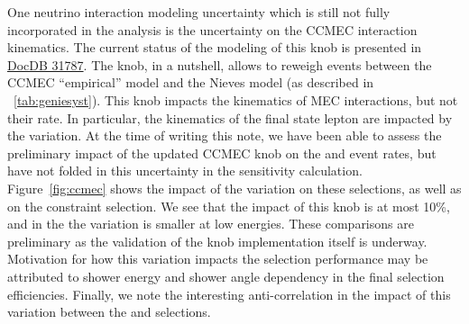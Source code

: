 One neutrino interaction modeling uncertainty which is still not fully incorporated in the analysis is the uncertainty on the CCMEC interaction kinematics. The current status of the modeling of this knob is presented in \href{https://microboone-docdb.fnal.gov/cgi-bin/private/ShowDocument?docid=31787}{DocDB 31787}. The knob, in a nutshell, allows to reweigh events between the CCMEC ``empirical'' model and the Nieves model (as described in ~\cref{tab:geniesyst}). This knob impacts the kinematics of MEC interactions, but not their rate. In particular, the kinematics of the final state lepton are impacted by the variation. At the time of writing this note, we have been able to assess the preliminary impact of the updated CCMEC knob on the \npsel and \zpsel event rates, but have not folded in this uncertainty in the sensitivity calculation. Figure~\ref{fig:ccmec} shows the impact of the variation on these selections, as well as on the constraint \numu selection. We see that the impact of this knob is at most 10\%, and in the \npsel the variation is smaller at low energies. These comparisons are preliminary as the validation of the knob implementation itself is underway. Motivation for how this variation impacts the selection performance may be attributed to shower energy and shower angle dependency in the final selection efficiencies. Finally, we note the interesting anti-correlation in the impact of this variation between the \npsel and \zpsel selections.

